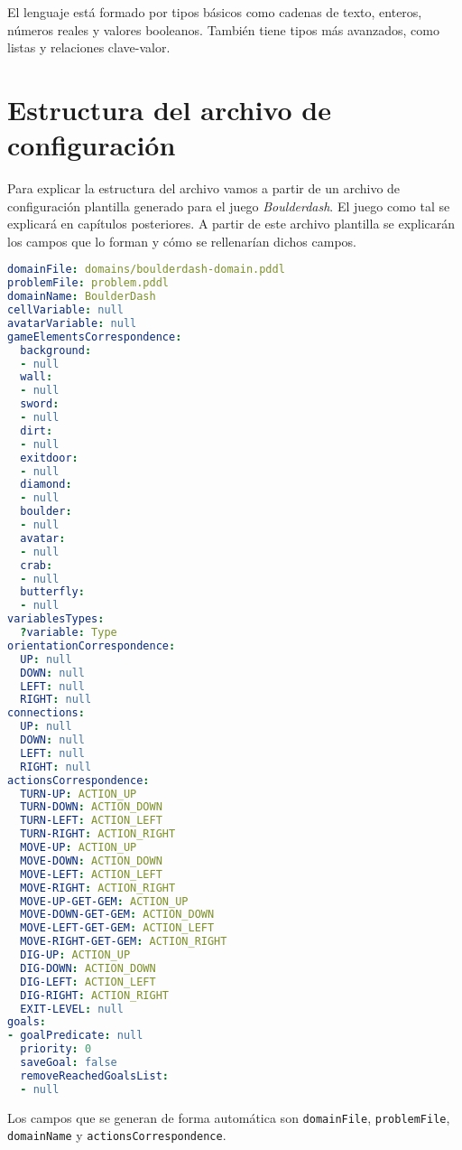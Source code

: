 El lenguaje está formado por tipos básicos como cadenas de texto, enteros, números reales y valores
booleanos. También tiene tipos más avanzados, como listas y relaciones clave-valor.

\section{Estructura del archivo de configuración}

Para explicar la estructura del archivo vamos a partir de un archivo de configuración plantilla
generado para el juego \textit{Boulderdash}. El juego como tal se explicará en capítulos posteriores.
A partir de este archivo plantilla se explicarán los campos que lo forman y cómo se rellenarían dichos
campos.

\begin{lstlisting}[language=yaml]
domainFile: domains/boulderdash-domain.pddl
problemFile: problem.pddl
domainName: BoulderDash
cellVariable: null
avatarVariable: null
gameElementsCorrespondence:
  background:
  - null
  wall:
  - null
  sword:
  - null
  dirt:
  - null
  exitdoor:
  - null
  diamond:
  - null
  boulder:
  - null
  avatar:
  - null
  crab:
  - null
  butterfly:
  - null
variablesTypes:
  ?variable: Type
orientationCorrespondence:
  UP: null
  DOWN: null
  LEFT: null
  RIGHT: null
connections:
  UP: null
  DOWN: null
  LEFT: null
  RIGHT: null
actionsCorrespondence:
  TURN-UP: ACTION_UP
  TURN-DOWN: ACTION_DOWN
  TURN-LEFT: ACTION_LEFT
  TURN-RIGHT: ACTION_RIGHT
  MOVE-UP: ACTION_UP
  MOVE-DOWN: ACTION_DOWN
  MOVE-LEFT: ACTION_LEFT
  MOVE-RIGHT: ACTION_RIGHT
  MOVE-UP-GET-GEM: ACTION_UP
  MOVE-DOWN-GET-GEM: ACTION_DOWN
  MOVE-LEFT-GET-GEM: ACTION_LEFT
  MOVE-RIGHT-GET-GEM: ACTION_RIGHT
  DIG-UP: ACTION_UP
  DIG-DOWN: ACTION_DOWN
  DIG-LEFT: ACTION_LEFT
  DIG-RIGHT: ACTION_RIGHT
  EXIT-LEVEL: null
goals:
- goalPredicate: null
  priority: 0
  saveGoal: false
  removeReachedGoalsList:
  - null
\end{lstlisting}

Los campos que se generan de forma automática son \texttt{domainFile}, \texttt{problemFile},
\texttt{domainName} y \texttt{actionsCorrespondence}.